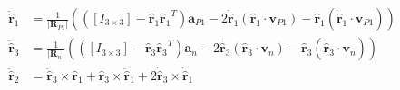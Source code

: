 \documentclass[]{AVSSimReportMemo}
\begin{document}
\begin{subequations}
	\begin{align}
		\ddot{\hat{\bm{r}}}_1 &= \frac{1}{|{\bm R}_{P1}|}
		(
		([I_{3\times3}] - {\hat{\bm{r}}_1}{\hat{\bm{r}}_1}^T)  \bm{a}_{P1} -
		2\dot{\hat{\bm{r}}}_1 (\hat{\bm{r}}_1 \cdot \bm{v}_{P1}) -
		\hat{\bm{r}}_1 (\dot{\hat{\bm{r}}}_1 \cdot \bm{v}_{P1})
		) \\
		\ddot{\hat{\bm{r}}}_3 &= \frac{1}{|{\bm R}_{n}|}
		(
		([I_{3\times3}] - {\hat{\bm{r}}_3}{\hat{\bm{r}}_3}^T)  \bm{a}_{n} -
		2\dot{\hat{\bm{r}}}_3 (\hat{\bm{r}}_3 \cdot \bm{v}_{n}) -
		\hat{\bm{r}}_3 (\dot{\hat{\bm{r}}}_3 \cdot \bm{v}_{n})
		) \\
		\ddot{\hat{\bm{r}}}_2 &= \ddot{\hat{\bm{r}}}_3 \times \hat{\bm{r}}_1 +  \hat{\bm{r}}_3  \times \ddot{\hat{\bm{r}}}_1 + 2\dot{\hat{\bm{r}}}_3 \times \dot{\hat{\bm{r}}}_1
	\end{align}
\end{subequations}
\end{document}
